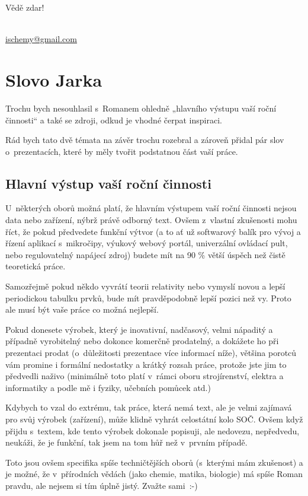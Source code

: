 \documentclass{template/socthesis}
\begin{document}
\vspace{\baselineskip}
\noindent Vědě zdar!

\vspace{\baselineskip}
\noindent {} \\
\url{ischemy@gmail.com}

\chapter{Slovo Jarka}
Trochu bych nesouhlasil s~Romanem ohledně „hlavního výstupu vaší roční činnosti“ a také se zdroji, odkud je vhodné čerpat inspiraci.

Rád bych tato dvě témata na závěr trochu rozebral a zároveň přidal pár slov o~prezentacích, které by měly tvořit podstatnou část vaší práce.

\section{Hlavní výstup vaší roční činnosti}
U~některých oborů možná platí, že hlavním výstupem vaší roční činnosti nejsou data nebo zařízení, nýbrž právě odborný text.
Ovšem z~vlastní zkušenosti mohu říct, že pokud předvedete funkční výtvor (a to ať už softwarový balík pro vývoj a řízení aplikací s~mikročipy, výukový webový portál, univerzální ovládací pult, nebo regulovatelný napájecí zdroj) budete mít na 90 \% větší úspěch než čistě teoretická práce.

Samozřejmě pokud někdo vyvrátí teorii relativity nebo vymyslí novou a lepší periodickou tabulku prvků, bude mít pravděpodobně lepší pozici než vy.
Proto ale musí být vaše práce co možná nejlepší.

Pokud donesete výrobek, který je inovativní, nadčasový, velmi nápaditý a případně vyrobitelný nebo dokonce komerčně prodatelný, a dokážete ho při prezentaci prodat (o~důležitosti prezentace více informací níže), většina porotců vám promine i formální nedostatky a krátký rozsah práce, protože jste jim to předvedli naživo (minimálně toto platí v~rámci oboru strojírenství, elektra a informatiky a podle mě i fyziky, učebních pomůcek atd.)

Kdybych to vzal do extrému, tak práce, která nemá text, ale je velmi zajímavá pro svůj výrobek (zařízení), může klidně vyhrát celostátní kolo SOČ.
Ovšem když přijdu s~textem, kde tento výrobek dokonale popisuji, ale nedovezu, nepředvedu, neukáži, že je funkční, tak jsem na tom hůř než v~prvním případě.

Toto jsou ovšem specifika spíše techničtějších oborů (s~kterými mám zkušenost) a je možné, že v~přírodních vědách (jako chemie, matika, biologie) má spíše Roman pravdu, ale nejsem si tím úplně jistý.
Zvažte sami~:-)
\end{document}
